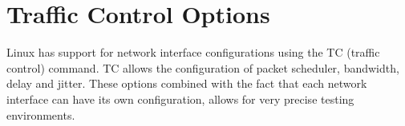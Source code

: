 \documentclass[a4paper,english, 11pt]{report}
\begin{document}
\section{Traffic Control Options}
Linux has support for network interface configurations using the TC (traffic control) command. TC allows the configuration of packet scheduler, bandwidth, delay and jitter. These options combined with the fact that each network interface can have its own configuration, allows for very precise testing environments.\\
%
%
%
\end{document}

